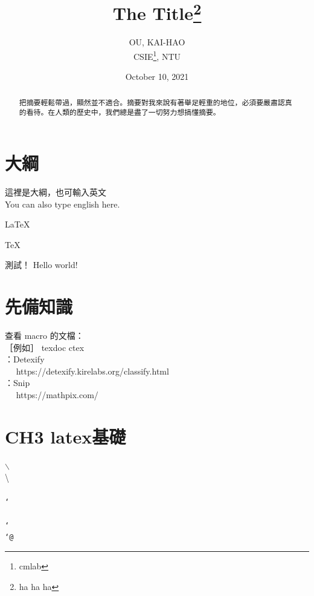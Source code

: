 \documentclass[12pt]{article}
\title{The Title\thanks{ha ha ha}}
\author{OU, KAI-HAO\\CSIE\thanks{cmlab}, NTU}
\date{October 10, 2021}
\begin{document}
\begin{CJK*}{UTF8}{bkai} %
	\maketitle
	\tableofcontents
	\begin{abstract}
	把摘要輕鬆帶過，顯然並不適合。摘要對我來說有著舉足輕重的地位，必須要嚴肅認真的看待。在人類的歷史中，我們總是盡了一切努力想搞懂摘要。
	\end{abstract}
	
	\newpage
	\section{大綱}
	
	這裡是大綱，也可輸入英文 \\
	You can also type english here.
	
	\LaTeX
	
	\LaTeXe
	
	\TeX
	
	測試！ Hello world!
	
	\section{先備知識}
	
	查看 macro 的文檔：\\	
	［例如］ texdoc ctex \\
	
	：Detexify \\　
	https://detexify.kirelabs.org/classify.html \\
	
	：Snip \\　
	https://mathpix.com/ \\
	
	\section{CH3 latex基礎}
	
	$\backslash$  \\
	\textbackslash  \\
	\texttt{}  \\
	\texttt{\char`\\}  \\
	\texttt{\char`~}  \\
	\texttt{\char`@}  \\
		

\end{CJK*}
\end{document}
